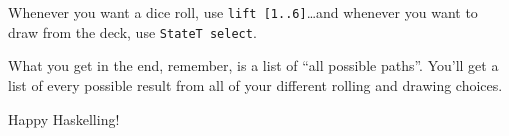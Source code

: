\documentclass[]{article}
\begin{document}
Whenever you want a dice roll, use \texttt{lift\ {[}1..6{]}}\ldots{}and
whenever you want to draw from the deck, use \texttt{StateT\ select}.

What you get in the end, remember, is a list of ``all possible paths''.
You'll get a list of every possible result from all of your different
rolling and drawing choices.

Happy Haskelling!
\end{document}
